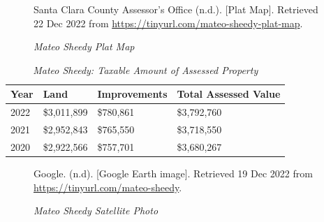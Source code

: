 \begin{figure}[hbtp]
  \caption[Mateo Sheedy Plat Map]{\textit{Mateo Sheedy Plat Map}}%
  \label{fig:mateo-sheedy-plat-map}
  {Santa Clara County Assessor's Office (n.d.). [Plat Map]. Retrieved 22 Dec 2022 from  \url{https://tinyurl.com/mateo-sheedy-plat-map}.}
\end{figure}

\begin{table}[hbtp]
  \SingleSpacing%
  \caption[Mateo Sheedy: Taxable Amount of Assessed Propery]{\textit{Mateo Sheedy: Taxable Amount of Assessed Property}}%
  \label{tab:mateo-sheedy-taxable-amount}
  \begin{tabular}{llll}
    \toprule
    Year & Land        & Improvements & Total Assessed Value \\
    \midrule
    2022 & \$3,011,899 & \$780,861    & \$3,792,760 \\
    2021 & \$2,952,843 & \$765,550    & \$3,718,550 \\
    2020 & \$2,922,566 & \$757,701    & \$3,680,267 \\
    \bottomrule
  \end{tabular}
\end{table}

\begin{figure}[hbtp]
  \caption[Mateo Sheedy Satellite Photo]{\textit{Mateo Sheedy Satellite Photo}}%
  \label{fig:mateo-sheedy-sat-photo}
  {Google. (n.d). [Google Earth image]. Retrieved 19 Dec 2022 from \url{https://tinyurl.com/mateo-sheedy}.}
\end{figure}

